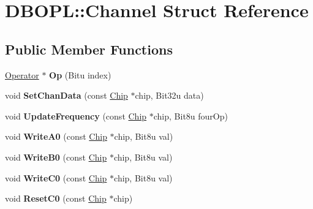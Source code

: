 \hypertarget{structDBOPL_1_1Channel}{\section{D\-B\-O\-P\-L\-:\-:Channel Struct Reference}
\label{structDBOPL_1_1Channel}
}
\subsection*{Public Member Functions}
\begin{DoxyCompactItemize}
\item 
\hypertarget{structDBOPL_1_1Channel_a54d428b50eb682592bbd51f56a62a4f9}{\hyperlink{structDBOPL_1_1Operator}{Operator} $\ast$ {\bfseries Op} (Bitu index)}\label{structDBOPL_1_1Channel_a54d428b50eb682592bbd51f56a62a4f9}

\item 
\hypertarget{structDBOPL_1_1Channel_ae6e7eafa3ea682e7e5c7f4a50f197181}{void {\bfseries Set\-Chan\-Data} (const \hyperlink{structDBOPL_1_1Chip}{Chip} $\ast$chip, Bit32u data)}\label{structDBOPL_1_1Channel_ae6e7eafa3ea682e7e5c7f4a50f197181}

\item 
\hypertarget{structDBOPL_1_1Channel_a86f42e926233a28c6bc3448e54cfd546}{void {\bfseries Update\-Frequency} (const \hyperlink{structDBOPL_1_1Chip}{Chip} $\ast$chip, Bit8u four\-Op)}\label{structDBOPL_1_1Channel_a86f42e926233a28c6bc3448e54cfd546}

\item 
\hypertarget{structDBOPL_1_1Channel_a756b7c37c2137e336260c5afeabecd49}{void {\bfseries Write\-A0} (const \hyperlink{structDBOPL_1_1Chip}{Chip} $\ast$chip, Bit8u val)}\label{structDBOPL_1_1Channel_a756b7c37c2137e336260c5afeabecd49}

\item 
\hypertarget{structDBOPL_1_1Channel_aa9153eb97e4a16d9da0169eb65b92bcb}{void {\bfseries Write\-B0} (const \hyperlink{structDBOPL_1_1Chip}{Chip} $\ast$chip, Bit8u val)}\label{structDBOPL_1_1Channel_aa9153eb97e4a16d9da0169eb65b92bcb}

\item 
\hypertarget{structDBOPL_1_1Channel_ac49656ad221520c54e6d8f477a198449}{void {\bfseries Write\-C0} (const \hyperlink{structDBOPL_1_1Chip}{Chip} $\ast$chip, Bit8u val)}\label{structDBOPL_1_1Channel_ac49656ad221520c54e6d8f477a198449}

\item 
\hypertarget{structDBOPL_1_1Channel_ad65c5163d1a8dfbe60b52682b6ae5321}{void {\bfseries Reset\-C0} (const \hyperlink{structDBOPL_1_1Chip}{Chip} $\ast$chip)}\label{structDBOPL_1_1Channel_ad65c5163d1a8dfbe60b52682b6ae5321}


\end{DoxyCompactItemize}
